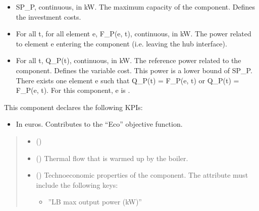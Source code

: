 \documentclass[letterpaper,10pt,english]{sphinxmanual}
\begin{document}
\begin{fulllineitems}
\begin{fulllineitems}
\begin{itemize}
\item {} 
\sphinxAtStartPar
SP\_P, continuous, in kW.
The maximum capacity of the component. Defines the investment costs.

\item {} 
\sphinxAtStartPar
For all t, for all element e, F\_P(e, t), continuous, in kW.
The power related to element e entering the component (i.e. leaving the hub interface).

\item {} 
\sphinxAtStartPar
For all t, Q\_P(t), continuous, in kW.
The reference power related to the component. Defines the variable cost.
This power is a lower bound of SP\_P.
There exists one element e such that Q\_P(t) = F\_P(e, t) or Q\_P(t) = \sphinxhyphen{} F\_P(e, t).
For this component, e is .

\end{itemize}

\sphinxAtStartPar
This component declares the following KPIs:
\begin{itemize}
\item {} 
\sphinxAtStartPar
{}
In euros.
Contributes to the “Eco” objective function.

\end{itemize}
\begin{quote}\begin{description}
\begin{itemize}
\item {} 
\sphinxAtStartPar
{} ({\hyperref[\detokenize{generated/tamos.element.ElectricityVector:tamos.element.ElectricityVector}]{}}) \textendash{} 

\item {} 
\sphinxAtStartPar
{} () \textendash{} Thermal flow that is warmed up by the boiler.

\item {} 
\sphinxAtStartPar
{} (\sphinxstyleliteralemphasis{\sphinxupquote{ | }}) \textendash{} 
\sphinxAtStartPar
Techno\sphinxhyphen{}economic properties of the component.
The  attribute must include the following keys:
\begin{itemize}
\item {} 
\sphinxAtStartPar
”LB max output power (kW)”


\end{itemize}
\end{itemize}
\end{description}
\end{quote}
\end{fulllineitems}
\end{fulllineitems}
\end{document}
